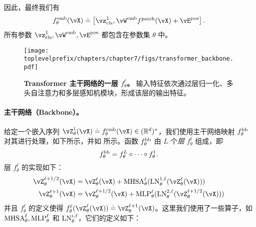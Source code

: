 \documentclass[../../book-main.tex]{subfiles}
\begin{document}
因此，最终我们有
\begin{equation}\label{eq:definition_of_embedding_module}
    f_{\theta}^{\emb}(\vX) \doteq \mat{\vz_{\cls}^{1}, \vW^{\emb}f^{\patch}(\vX) + \vE^{\pos}}.
\end{equation}
所有参数 \(\vz_{\cls}^{1}, \vW^{\emb}, \vE^{\pos}\) 都包含在参数集 \(\theta\) 中。

\begin{figure}
    \centering 
    \texttt{[image: \\toplevelprefix/chapters/chapter7/figs/transformer\_backbone.pdf]}
    \caption{\small\textbf{Transformer 主干网络的一层 \(f_{\theta}^{\ell}\)。} 输入特征依次通过层归一化、多头自注意力和多层感知机模块，形成该层的输出特征。}
    \label{fig:transformer_backbone}
\end{figure}

\paragraph{主干网络（Backbone）。} 给定一个嵌入序列 \(\vZ_{\theta}^{1}(\vX) \doteq f_{\theta}^{\emb}(\vX) \in (\R^{d})^{*}\)，我们使用主干网络映射 \(f_{\theta}^{\mathrm{bb}}\) 对其进行处理，如下所示，并如  所示。函数 \(f_{\theta}^{\mathrm{bb}}\) 由 \(L\) 个\textit{层} \(f_{\theta}^{\ell}\) 组成，即
\begin{equation}
    f_{\theta}^{\mathrm{bb}} = f_{\theta}^{L} \circ \cdots \circ f_{\theta}^{1}.
\end{equation}
 层 \(f_{\theta}^{\ell}\) 的实现如下：
\begin{align}\label{eq:vit-res-block}
    \vZ_{\theta}^{\ell + 1/2}(\vX)
    &= \vZ_{\theta}^{\ell}(\vX) + \MHSA_{\theta}^{\ell}(\LN_{\theta}^{1, \ell}(\vZ_{\theta}^{\ell}(\vX))) \\ 
    \vZ_{\theta}^{\ell + 1}(\vX)
    &= \vZ_{\theta}^{\ell + 1/2}(\vX) + \MLP_{\theta}^{\ell}(\LN_{\theta}^{2, \ell}(\vZ_{\theta}^{\ell + 1/2}(\vX)))
\end{align}
并且 \(f_{\theta}^{\ell}\) 的定义使得 \(f_{\theta}^{\ell}(\vZ_{\theta}^{\ell}(\vX)) \doteq \vZ_{\theta}^{\ell + 1}(\vX)\)。这里我们使用了一些算子，如 \(\operatorname{MHSA}_{\theta}^{\ell}, \operatorname{MLP}_{\theta}^{\ell}\) 和 \(\operatorname{LN}_{\theta}^{i, \ell}\)，它们的定义如下：
\end{document}
